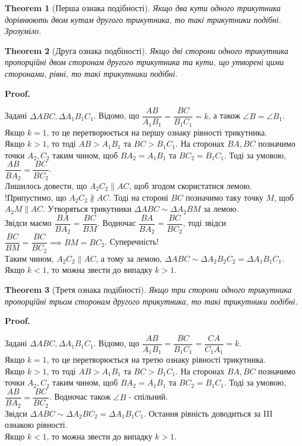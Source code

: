 \documentclass[a4paper, 10pt]{article}
\makeatletter
\def\qed{$\blacksquare$}
\theoremstyle{theoremdd}
\newtheorem{theorem}{Theorem}[subsection]
\theoremstyle{theoremdd}
\theoremstyle{theoremdd}
\theoremstyle{theoremdd}
\theoremstyle{theoremdd}
\theoremstyle{theoremdd}
\theoremstyle{theoremdd}
\theoremstyle{theoremdd}
\theoremstyle{theoremdd}
\renewenvironment{proof}[1][Proof.\\]{\par
\pushQED{\hfill \qed}%
\normalfont \topsep6\p@\@plus6\p@\relax
\trivlist
\item\relax
{\bfseries
#1\@addpunct{.}}\hspace\labelsep\ignorespaces
}{%
\popQED\endtrivlist\@endpefalse
}
\makeatother
\begin{document}
\begin{theorem}[Перша ознака подібності]
Якщо два кути одного трикутника дорівнюють двом кутам другого трикутника, то такі трикутники подібні.\\
\textit{Зрозуміло.}
\end{theorem}

\begin{theorem}[Друга ознака подбіності]
Якщо дві сторони одного трикутника пропорційні двом сторонам другого трикутника та кути, що утворені цими сторонами, рівні, то такі трикутники подібні.
\end{theorem}

\begin{proof}
Задані $\Delta ABC, \Delta A_1B_1C_1$. Відомо, що $\dfrac{AB}{A_1B_1} = \dfrac{BC}{B_1C_1} = k$, а також $\angle B = \angle B_1$.\\
Якщо $k = 1$, то це перетворюється на першу ознаку рівності трикутника.\\
Якщо $k > 1$, то тоді $AB > A_1B_1$ та $BC > B_1C_1$. На сторонах $BA,BC$ позначимо точки $A_2,C_2$ таким чином, щоб $BA_2 = A_1B_1$ та $BC_2 = B_1C_1$. Тоді за умовою, $\dfrac{AB}{BA_2} = \dfrac{BC}{BC_2}$.\\
Лишилось довести, що $A_2C_2 \parallel AC$, щоб згодом скористатися лемою.\\
!Припустимо, що $A_2C_2 \not\parallel AC$. Тоді на стороні $BC$ позначимо таку точку $M$, щоб $A_2M \parallel AC$. Утворяться трикутники $\Delta ABC \sim \Delta A_2BM$ за лемою.\\
Звідси маємо $\dfrac{BA}{BA_2} = \dfrac{BC}{BM}$. Водночас $\dfrac{BA}{BA_2} = \dfrac{BC}{BC_2}$, тоді звідси $\dfrac{BC}{BM} = \dfrac{BC}{BC_2} \implies BM = BC_2$. Суперечність!\\
Таким чином,  $A_2C_2 \parallel AC$, а тому за лемою, $\Delta ABC \sim \Delta A_2B_2C_2 = \Delta A_1B_1C_1$.\\
Якщо $k < 1$, то можна звести до випадку $k > 1$.
\end{proof}

\begin{theorem}[Третя ознака подібності]
Якщо три сторони одного трикутника пропорційні трьом сторонам другого трикутника, то такі трикутники подібні.
\end{theorem}

\begin{proof}
Задані $\Delta ABC, \Delta A_1B_1C_1$. Відомо, що $\dfrac{AB}{A_1B_1} = \dfrac{BC}{B_1C_1} = \dfrac{CA}{C_1A_1} = k$.\\
Якщо $k=1$, то це перетворюється на третю ознаку рівності трикутника.\\
Якщо $k > 1$, то тоді $AB > A_1B_1$ та $BC > B_1C_1$. На сторонах $BA,BC$ позначимо точки $A_2,C_2$ таким чином, щоб $BA_2 = A_1B_1$ та $BC_2 = B_1C_1$. Тоді за умовою, $\dfrac{AB}{BA_2} = \dfrac{BC}{BC_2}$. Водночас також $\angle B$ - спільний.\\
Звідси $\Delta ABC \sim \Delta A_2BC_2 = \Delta A_1B_1C_1$. Остання рівність доводиться за III ознакою рівності.\\
Якщо $k < 1$, то можна звести до випадку $k >1$.
\end{proof}
\end{document}
